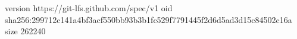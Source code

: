 version https://git-lfs.github.com/spec/v1
oid sha256:299712c141a4bf3acf550bb93b3b1fc529f7791445f2d6d5ad3d15c84502c16a
size 262240
